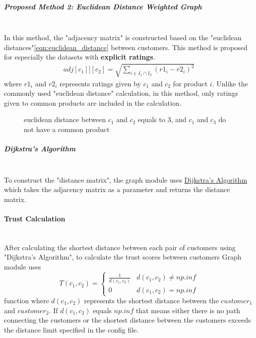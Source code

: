 	\subparagraph{Proposed Method 2: Euclidean Distance Weighted Graph}\mbox{}\\
	\label{prop_method_2}
	In this method, the "adjacency matrix" is constructed based on the "euclidean distances"\ref{eqn:euclidean_distance} between customers. This method is proposed for especially the datasets with \textbf{explicit ratings}.
	\begin{equation} 
	\label{eqn:euclidean_distance}
	\begin{split}
	adj[c_{1}]][c_{2}] = \sqrt{\sum_{i\in I_{1}\cap I_{2}}^{} (r1_{i}-r2_{i})^2}
	\end{split}
	\end{equation}
	where $r1_{i}$ and $r2_{i}$ represents ratings given by $c_{1}$ and $c_{2}$ for product $i$. Unlike the commonly used "euclidean distance" calculation, in this method, only ratings given to common products are included in the calculation.
	\begin{figure}[H]
		\centering
		\caption{euclidean distance between $c_{1}$ and $c_{2}$ equals to 3, and $c_{1}$ and $c_{3}$ do not have a common product}
	\end{figure}
	
	\subparagraph{Dijkstra's Algorithm}\mbox{}\\
	To construct the "distance matrix", the graph module uses \href{https://en.wikipedia.org/wiki/Dijkstra%27s_algorithm}{Dijkstra's Algorithm} which takes the adjacency matrix as a parameter and returns the distance matrix.
	
	\paragraph{Trust Calculation}\mbox{}\\
	After calculating the shortest distance between each pair of customers using "Dijkstra's Algorithm", to calculate the trust scores between customers Graph module uses
	\begin{equation*} 
	T(c_{1}, c_{2})= \left\{
	\begin{array}{lr} 
	\frac{1}{d(c_{1}, c_{2})} & d(c_{1}, c_{2}) \neq np.inf \\
	0 & d(c_{1}, c_{2}) = np.inf
	\end{array}
	\right.
	\end{equation*}
	function where $d(c_{1}, c_{2})$ represents the shortest distance between the $customer_{1}$ and $customer_{2}$. If $d(c_{1}, c_{2})$ equals $np.inf$ that means either there is no path connecting the customers or the shortest distance between the customers exceeds the distance limit specified in the config file. \\
	
